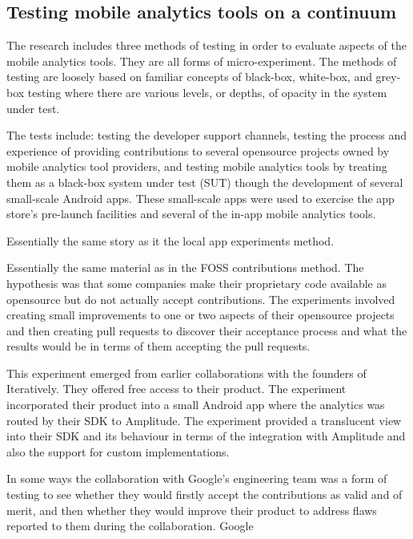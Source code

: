 \subsection{Testing mobile analytics tools on a continuum}


 The research includes three methods of testing in order to evaluate aspects of the mobile analytics tools. 
 They are all forms of micro-experiment. The methods of testing are loosely based on familiar concepts of black-box, white-box, and grey-box testing where there are various levels, or depths, of opacity in the system under test.

The tests include: testing the developer support channels, testing the process and experience of providing contributions to several opensource projects owned by mobile analytics tool providers, and testing mobile analytics tools by treating them as a black-box system under test (SUT) though the development of several small-scale Android apps. These small-scale apps were used to exercise the app store's pre-launch facilities and several of the in-app mobile analytics tools.

Essentially the same story as it the local app experiments method.

Essentially the same material as in the FOSS contributions method. The hypothesis was that some companies make their proprietary code available as opensource but do not actually accept contributions. The experiments involved creating small improvements to one or two aspects of their opensource projects and then creating pull requests to discover their acceptance process and what the results would be in terms of them accepting the pull requests.

This experiment emerged from earlier collaborations with the founders of Iteratively. They offered free access to their product. The experiment incorporated their product into a small Android app where the analytics was routed by their SDK to Amplitude. The experiment provided a translucent view into their SDK and its behaviour in terms of the integration with Amplitude and also the support for custom implementations.

In some ways the collaboration with Google's engineering team was a form of testing to see whether they would firstly accept the contributions as valid and of merit, and then whether they would improve their product to address flaws reported to them during the collaboration. Google 